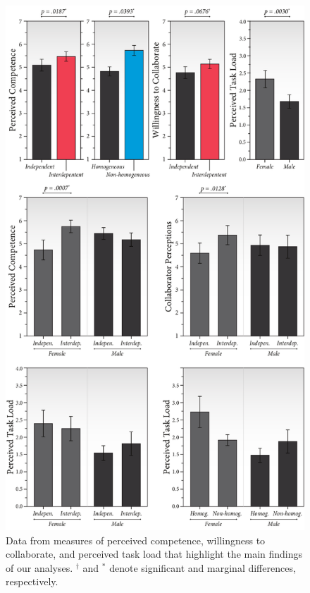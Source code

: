 \begin{figure}[!t]
	\caption{Data from measures of perceived competence, willingness to collaborate, and perceived task load that highlight the main findings of our analyses. $^\dagger$ and $^*$ denote significant and marginal differences, respectively.}
	\label{fig:data}
	\includegraphics[width=\columnwidth]{figures/hri18-aksari-figures_data-figures.pdf}
\end{figure} 

